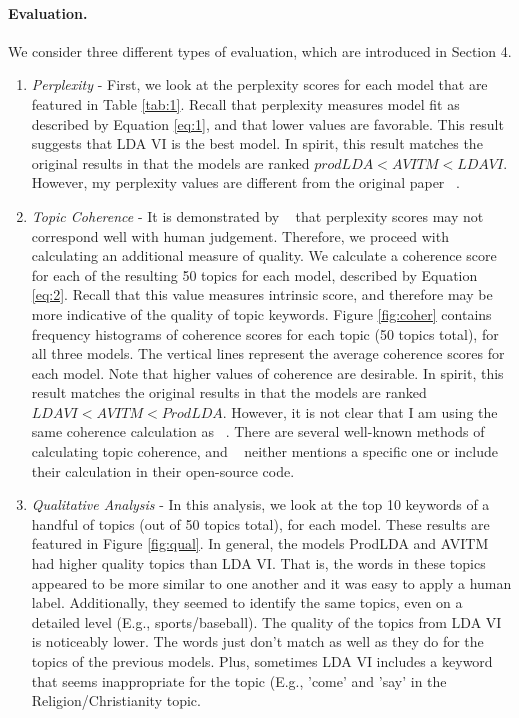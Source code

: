 \documentclass[10pt,twocolumn,letterpaper]{article}
\begin{document}
\paragraph{Evaluation.}
We consider three different types of evaluation, which are introduced in Section 4.
\begin{enumerate}
    \item \textit{Perplexity} - First, we look at the perplexity scores for each model that are featured in Table \ref{tab:1}.
    Recall that perplexity measures model fit as described by Equation \eqref{eq:1}, and that lower values are favorable.
    This result suggests that LDA VI is the best model.
    In spirit, this result matches the original results in that the models are ranked $prodLDA < AVITM < LDA VI$.
    However, my perplexity values are different from the original paper ~\cite{srivastava2017autoencoding}.
    \item \textit{Topic Coherence} - It is demonstrated by ~\cite{chang2009reading} that perplexity scores may not correspond well with human judgement.
    Therefore, we proceed with calculating an additional measure of quality.
    We calculate a coherence score for each of the resulting 50 topics for each model, described by Equation \eqref{eq:2}.
    Recall that this value measures intrinsic score, and therefore may be more indicative of the quality of topic keywords.
    Figure \ref{fig:coher} contains frequency histograms of coherence scores for each topic (50 topics total), for all three models.
    The vertical lines represent the average coherence scores for each model.
    Note that higher values of coherence are desirable.
    In spirit, this result matches the original results in that the models are ranked $LDA VI < AVITM < ProdLDA$.
    However, it is not clear that I am using the same coherence calculation as ~\cite{srivastava2017autoencoding}.
    There are several well-known methods of calculating topic coherence, and ~\cite{srivastava2017autoencoding} neither mentions a specific one or include their calculation in their open-source code.
    \item \textit{Qualitative Analysis} - In this analysis, we look at the top 10 keywords of a handful of topics (out of 50 topics total), for each model.
    These results are featured in Figure \ref{fig:qual}.
    In general, the models ProdLDA and AVITM had higher quality topics than LDA VI.
    That is, the words in these topics appeared to be more similar to one another and it was easy to apply a human label.
    Additionally, they seemed to identify the same topics, even on a detailed level (E.g., sports/baseball).
    The quality of the topics from LDA VI is noticeably lower.
    The words just don't match as well as they do for the topics of the previous models.
     Plus, sometimes LDA VI includes a keyword that seems inappropriate for the topic (E.g., 'come' and 'say' in the Religion/Christianity topic.
\end{enumerate}
\end{document}
